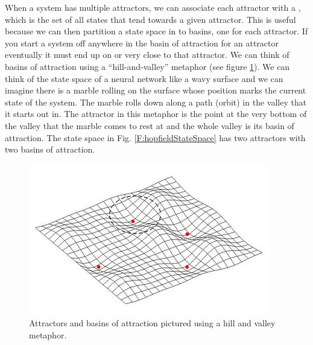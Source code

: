 When a system has multiple attractors, we can associate each attractor with a , which is the set of all states that tend towards a 
given attractor. This is useful because we can then partition a state space in to basins, one for each attractor. If you start a system off anywhere in the basin of attraction for an attractor eventually it must end up on or very close to that attractor. 
We can think of basins of attraction using a ``hill-and-valley'' metaphor  (see
figure \ref{F:basins}). We can think of the state space of a neural network 
like a wavy surface and we can imagine there is a marble rolling on the surface 
whose position marks the current state of the system. The marble rolls down 
along a path (orbit) in the valley that it starts out in. The attractor in 
this metaphor is the point at the very bottom of the valley that the marble 
comes to rest at and the whole valley is its basin of attraction. The state space in Fig. \ref{F:hopfieldStateSpace} has two attractors with two basins of attraction.
\begin{figure}[h]
\centering
\includegraphics[scale=.5]{./images/BasinAttraction.jpeg}
\caption[From \url{http://www.scholarpedia.org/article/File:Hopfieldattractor.jpg}. Licensed Under CC BY-NC-SA]{Attractors and basins of attraction pictured using a hill and valley 
metaphor.}
\label{F:basins}
\end{figure}

